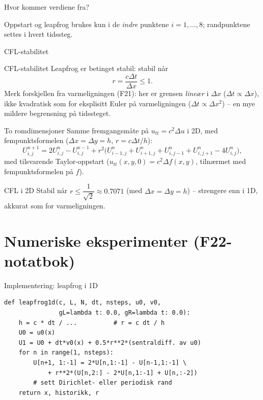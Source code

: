 \documentclass[11pt,aspectratio=169]{beamer}
\begin{document}
\begin{frame}{Hvor kommer verdiene fra?}
\centering


\vspace{0.3em}
\small Oppstart og leapfrog brukes kun i de \emph{indre} punktene $i=1,\ldots,8$; randpunktene settes i hvert tidssteg.
\end{frame}

\begin{frame}{CFL-stabilitet}
\begin{remb}{CFL-stabilitet}
Leapfrog er betinget stabil: stabil når
\[
r = \frac{c\Delta t}{\Delta x} \leq 1.
\]
Merk forskjellen fra varmeligningen (F21): her er grensen \emph{lineær} i $\Delta x$ ($\Delta t\propto\Delta x$), ikke kvadratisk som for eksplisitt Euler på varmeligningen ($\Delta t\propto\Delta x^2$) -- en mye mildere begrensning på tidssteget.
\end{remb}
\end{frame}

\begin{frame}{To romdimensjoner}
Samme fremgangsmåte på $u_{tt}=c^2\Delta u$ i 2D, med fempunktsformelen ($\Delta x=\Delta y=h$, $r=c\Delta t/h$):
\begin{equation}
U_{i,j}^{n+1} = 2U_{i,j}^n - U_{i,j}^{n-1} + r^2\Big(U_{i-1,j}^n+U_{i+1,j}^n+U_{i,j-1}^n+U_{i,j+1}^n - 4U_{i,j}^n\Big),
\end{equation}
med tilsvarende Taylor-oppstart ($u_{tt}(x,y,0)=c^2\Delta f(x,y)$, tilnærmet med fempunktsformelen på $f$).
\begin{remb}{CFL i 2D}
Stabil når $r\le \dfrac{1}{\sqrt2}\approx 0.7071$ (med $\Delta x=\Delta y=h$) -- strengere enn i 1D, akkurat som for varmeligningen.
\end{remb}
\end{frame}

\section{Numeriske eksperimenter (F22-notatbok)}

\begin{frame}[fragile]{Implementering: leapfrog i 1D}
\begin{lstb}[leapfrog1d]
\begin{verbatim}
def leapfrog1d(c, L, N, dt, nsteps, u0, v0,
               gL=lambda t: 0.0, gR=lambda t: 0.0):
    h = c * dt / ...          # r = c dt / h
    U0 = u0(x)
    U1 = U0 + dt*v0(x) + 0.5*r**2*(sentraldiff. av u0)
    for n in range(1, nsteps):
        U[n+1, 1:-1] = 2*U[n,1:-1] - U[n-1,1:-1] \
            + r**2*(U[n,2:] - 2*U[n,1:-1] + U[n,:-2])
        # sett Dirichlet- eller periodisk rand
    return x, historikk, r
\end{verbatim}
\end{lstb}
\end{frame}
\end{document}
